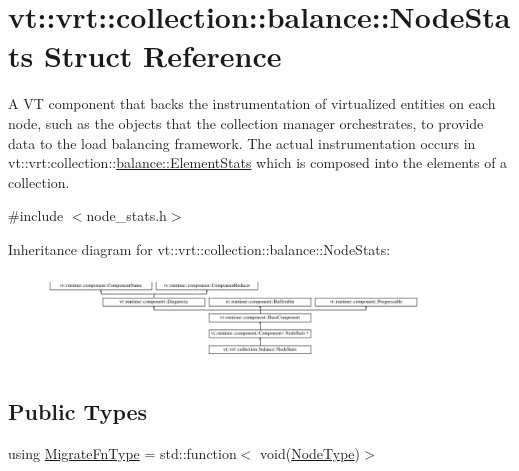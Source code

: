 \hypertarget{structvt_1_1vrt_1_1collection_1_1balance_1_1_node_stats}{}\section{vt\+:\+:vrt\+:\+:collection\+:\+:balance\+:\+:Node\+Stats Struct Reference}
\label{structvt_1_1vrt_1_1collection_1_1balance_1_1_node_stats}


A VT component that backs the instrumentation of virtualized entities on each node, such as the objects that the collection manager orchestrates, to provide data to the load balancing framework. The actual instrumentation occurs in {\ttfamily vt\+::vrt\+:collection\+:}\+:\hyperlink{structvt_1_1vrt_1_1collection_1_1balance_1_1_element_stats}{balance\+::\+Element\+Stats} which is composed into the elements of a collection.  




{\ttfamily \#include $<$node\+\_\+stats.\+h$>$}

Inheritance diagram for vt\+:\+:vrt\+:\+:collection\+:\+:balance\+:\+:Node\+Stats\+:\begin{figure}[H]
\begin{center}
\leavevmode
\includegraphics[height=2.380952cm]{structvt_1_1vrt_1_1collection_1_1balance_1_1_node_stats}
\end{center}
\end{figure}
\subsection*{Public Types}
\begin{DoxyCompactItemize}
\item 
using \hyperlink{structvt_1_1vrt_1_1collection_1_1balance_1_1_node_stats_af702e521887d9015e33a7aedda48d09d}{Migrate\+Fn\+Type} = std\+::function$<$ void(\hyperlink{namespacevt_a866da9d0efc19c0a1ce79e9e492f47e2}{Node\+Type})$>$
\end{DoxyCompactItemize}
